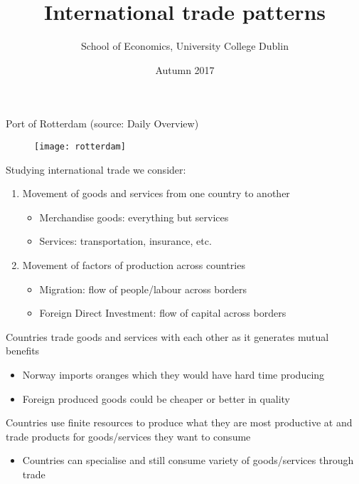 \documentclass{beamer}
\title{International trade patterns}
\author{School of Economics, University College Dublin}
\date{Autumn 2017}
\begin{document}
\begin{frame}
\titlepage  
\end{frame}

\begin{frame}{Port of Rotterdam (source: Daily Overview)}
  \begin{figure}\centering
    \texttt{[image: rotterdam]}
  \end{figure}
\end{frame}

\begin{frame}
  Studying international trade we consider:\bigskip
  \begin{enumerate}
    \item Movement of goods and services from one country to another
    \begin{itemize}
      \item Merchandise goods: everything but services
      \item Services: transportation, insurance, etc. 
    \end{itemize}
    \medskip
    \item Movement of factors of production across countries
    \begin{itemize}
      \item Migration: flow of people/labour across borders
      \item Foreign Direct Investment: flow of capital across borders
    \end{itemize}
  \end{enumerate}
\end{frame}

\begin{frame}{}
  Countries trade goods and services with each other as it generates mutual benefits
  \begin{itemize}
    \item Norway imports oranges which they would have hard time producing
    \item Foreign produced goods could be cheaper or better in quality
  \end{itemize}
  \medskip
  Countries use finite resources to produce what they are most productive at and trade products for goods/services they want to consume
  \begin{itemize}
    \item Countries can specialise and still consume variety of goods/services through trade
  \end{itemize}

\end{frame}
\end{document}
